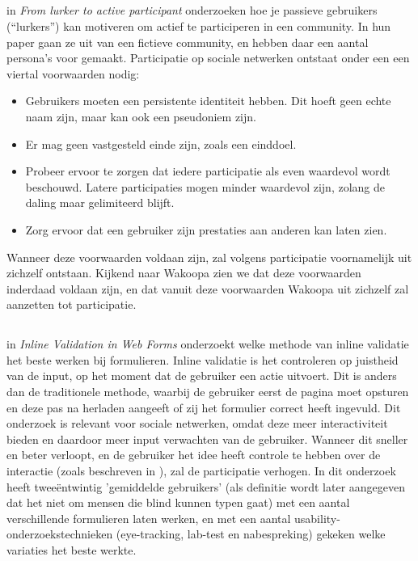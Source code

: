 \documentclass[a4paper, 10pt, pdftex]{report}
\begin{document}
    \subsection{\cite{Sloep2009}}

    in \emph{From lurker to active participant} onderzoeken \citeauthor{Sloep2009} hoe je passieve gebruikers (``lurkers'') kan motiveren om actief te participeren in een community. In hun paper gaan ze uit van een fictieve community, en hebben daar een aantal persona's voor gemaakt. Participatie op sociale netwerken ontstaat onder een een viertal voorwaarden nodig:
    \begin{itemize}
    \item Gebruikers moeten een persistente identiteit hebben. Dit hoeft geen echte naam zijn, maar kan ook een pseudoniem zijn.
    \item Er mag geen vastgesteld einde zijn, zoals een einddoel.
    \item Probeer ervoor te zorgen dat iedere participatie als even waardevol wordt beschouwd. Latere participaties mogen minder waardevol zijn, zolang de daling maar gelimiteerd blijft.
    \item Zorg ervoor dat een gebruiker zijn prestaties aan anderen kan laten zien.
  \end{itemize}
    Wanneer deze voorwaarden voldaan zijn, zal volgens \citeauthor{Sloep2009} participatie voornamelijk uit zichzelf ontstaan. Kijkend naar Wakoopa zien we dat deze voorwaarden inderdaad voldaan zijn, en dat vanuit deze voorwaarden Wakoopa uit zichzelf zal aanzetten tot participatie.

  \subsection{\cite{Wroblewski2009}}
    in \emph{Inline Validation in Web Forms} onderzoekt \citeauthor{Wroblewski2009} welke methode van inline validatie het beste werken bij formulieren. Inline validatie is het controleren op juistheid van de input, op het moment dat de gebruiker een actie uitvoert. Dit is anders dan de traditionele methode, waarbij de gebruiker eerst de pagina moet opsturen en deze pas na herladen aangeeft of zij het formulier correct heeft ingevuld. Dit onderzoek is relevant voor sociale netwerken, omdat deze meer interactiviteit bieden en daardoor meer input verwachten van de gebruiker. Wanneer dit sneller en beter verloopt, en de gebruiker het idee heeft controle te hebben over de interactie (zoals beschreven in \cite{Beenen2004}), zal de participatie verhogen. In dit onderzoek heeft \citeauthor{Wroblewski2009} twee\"{e}ntwintig 'gemiddelde gebruikers'  (als definitie wordt later aangegeven dat het niet om mensen die blind kunnen typen gaat) met een aantal verschillende formulieren laten werken, en met een aantal usability-onderzoekstechnieken (eye-tracking, lab-test en nabespreking) gekeken welke variaties het beste werkte.
\end{document}

